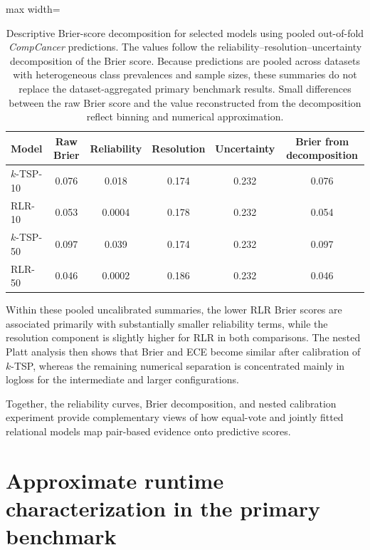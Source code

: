 \documentclass[11pt, a4paper]{article}
\newcommand{\stdtablefont}{\small}
\newcommand{\stdtablelayout}{%
  \stdtablefont
  \setlength{\tabcolsep}{4pt}
  \renewcommand{\arraystretch}{1.2}
}
\begin{document}
\begin{table}[!htbp]
\centering
\caption{Descriptive Brier-score decomposition for selected models using pooled out-of-fold \emph{CompCancer} predictions. The values follow the reliability--resolution--uncertainty decomposition of the Brier score. Because predictions are pooled across datasets with heterogeneous class prevalences and sample sizes, these summaries do not replace the dataset-aggregated primary benchmark results. Small differences between the raw Brier score and the value reconstructed from the decomposition reflect binning and numerical approximation.}
\label{tab:brier_decomposition_compcancer}
{\stdtablelayout
\begin{adjustbox}{max width=\linewidth}
\begin{tabular}{lccccc}
\toprule
\textbf{Model} &
\textbf{Raw Brier} &
\textbf{Reliability} &
\textbf{Resolution} &
\textbf{Uncertainty} &
\textbf{Brier from decomposition} \\
\midrule
$k$-TSP-10 & 0.076 & 0.018  & 0.174 & 0.232 & 0.076 \\
RLR-10     & 0.053 & 0.0004 & 0.178 & 0.232 & 0.054 \\
\midrule
$k$-TSP-50 & 0.097 & 0.039  & 0.174 & 0.232 & 0.097 \\
RLR-50     & 0.046 & 0.0002 & 0.186 & 0.232 & 0.046 \\
\bottomrule
\end{tabular}
\end{adjustbox}
}
\end{table}

Within these pooled uncalibrated summaries, the lower RLR Brier scores are associated primarily with substantially smaller reliability terms, while the resolution component is slightly higher for RLR in both comparisons. The nested Platt analysis then shows that Brier and ECE become similar after calibration of $k$-TSP, whereas the remaining numerical separation is concentrated mainly in logloss for the intermediate and larger configurations.

Together, the reliability curves, Brier decomposition, and nested calibration experiment provide complementary views of how equal-vote and jointly fitted relational models map pair-based evidence onto predictive scores.


\section{Approximate runtime characterization in the primary benchmark}
\end{document}
